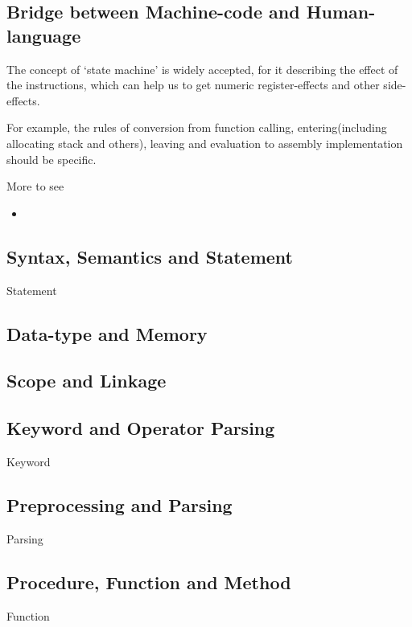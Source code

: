 
\subsection{Bridge between Machine-code and Human-language}

The concept of `state machine' is widely accepted, for it describing the effect of the instructions, which can help us to get numeric register-effects and other side-effects.

For example, the rules of conversion from function calling, entering(including allocating stack and others), leaving and evaluation to assembly implementation should be specific.

More to see
\begin{itemize}
	\item {}
\end{itemize}

\subsection{Syntax, Semantics and Statement}
{Statement}

\subsection{Data-type and Memory}


\subsection{Scope and Linkage}


\subsection{Keyword and Operator Parsing}
{Keyword}


\subsection{Preprocessing and Parsing}
{Parsing}

\subsection{Procedure, Function and Method}
{Function}


